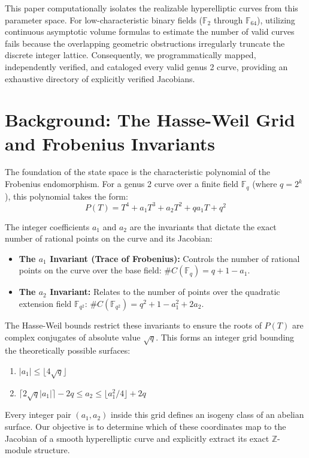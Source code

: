\documentclass[letterpaper, 11pt]{article}
\begin{document}
This paper computationally isolates the realizable hyperelliptic curves from this parameter space. For low-characteristic binary fields ($\mathbb{F}_2$ through $\mathbb{F}_{64}$), utilizing continuous asymptotic volume formulas to estimate the number of valid curves fails because the overlapping geometric obstructions irregularly truncate the discrete integer lattice. Consequently, we programmatically mapped, independently verified, and cataloged every valid genus 2 curve, providing an exhaustive directory of explicitly verified Jacobians.

\section{Background: The Hasse-Weil Grid and Frobenius Invariants}
The foundation of the state space is the characteristic polynomial of the Frobenius endomorphism. For a genus 2 curve over a finite field $\mathbb{F}_q$ (where $q = 2^k$), this polynomial takes the form:
\[ P(T) = T^4 + a_1 T^3 + a_2 T^2 + q a_1 T + q^2 \]

The integer coefficients $a_1$ and $a_2$ are the invariants that dictate the exact number of rational points on the curve and its Jacobian:
\begin{itemize}
    \item \textbf{The $a_1$ Invariant (Trace of Frobenius):} Controls the number of rational points on the curve over the base field: $\#C(\mathbb{F}_q) = q + 1 - a_1$.
    \item \textbf{The $a_2$ Invariant:} Relates to the number of points over the quadratic extension field $\mathbb{F}_{q^2}$: $\#C(\mathbb{F}_{q^2}) = q^2 + 1 - a_1^2 + 2a_2$.
\end{itemize}

The Hasse-Weil bounds restrict these invariants to ensure the roots of $P(T)$ are complex conjugates of absolute value $\sqrt{q}$. This forms an integer grid bounding the theoretically possible surfaces:
\begin{enumerate}
    \item $|a_1| \le \lfloor 4\sqrt{q} \rfloor$
    \item $\lceil 2\sqrt{q}|a_1| \rceil - 2q \le a_2 \le \lfloor a_1^2/4 \rfloor + 2q$
\end{enumerate}
Every integer pair $(a_1, a_2)$ inside this grid defines an isogeny class of an abelian surface. Our objective is to determine which of these coordinates map to the Jacobian of a smooth hyperelliptic curve and explicitly extract its exact $\mathbb{Z}$-module structure.
\end{document}
